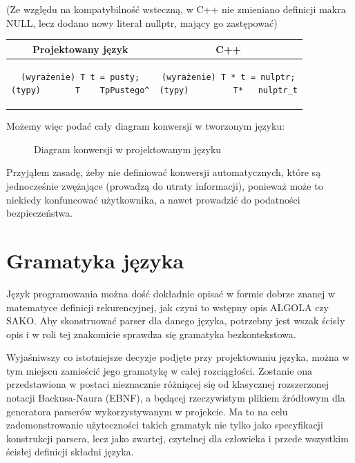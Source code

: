 (Ze względu na kompatybilność wsteczną, w C++ nie zmieniano definicji makra NULL, lecz dodano nowy literał nullptr, mający go zastępować)
\begin{center}
\begin{tabular}{|c|c|}
\hline
\textbf{Projektowany język} & \textbf{C++} \\ \hline
\begin{lstlisting}
(wyrażenie) T t = pusty;
(typy)       T    TpPustego^
\end{lstlisting}
& 
\begin{lstlisting}
(wyrażenie) T * t = nulptr;
(typy)         T*   nulptr_t
\end{lstlisting} \\\hline
\end{tabular}
\end{center}

Możemy więc podać cały diagram konwersji w tworzonym języku:

\begin{figure}[h]
    \centering
    
    \caption{Diagram konwersji w projektowanym języku}
\end{figure}

Przyjąłem zasadę, żeby nie definiować konwersji automatycznych, które są jednocześnie zwężające (prowadzą do utraty informacji), ponieważ może to niekiedy konfuncować  użytkownika, a nawet prowadzić do podatności bezpieczeństwa\cite[str.~260]{Reversing}.

\section{Gramatyka języka}
\label{sect:gramatyka}
Język programowania można dość dokładnie opisać w formie dobrze znanej w matematyce definicji rekurencyjnej, jak czyni to wstępny opis ALGOLA\cite{ALGOL_PRELIMINARY_REPORT} czy SAKO\cite{SAKO}. Aby skonstruować parser dla danego języka, potrzebny jest wszak ścisły opis i w roli tej znakomicie sprawdza się gramatyka bezkontekstowa.

Wyjaśniwszy co istotniejsze decyzje podjęte przy projektowaniu języka, można w tym miejscu zamieścić jego gramatykę w całej rozciągłości.
Zostanie ona przedstawiona w postaci nieznacznie różniącej się od klasycznej rozszerzonej notacji Backusa-Naura (EBNF), a będącej rzeczywistym plikiem źródłowym dla generatora parserów wykorzystywanym w projekcie. Ma to na celu zademonstrowanie użyteczności takich gramatyk nie tylko jako specyfikacji konstrukcji parsera, lecz jako zwartej, czytelnej dla człowieka i przede wszystkim ścisłej definicji składni języka.

